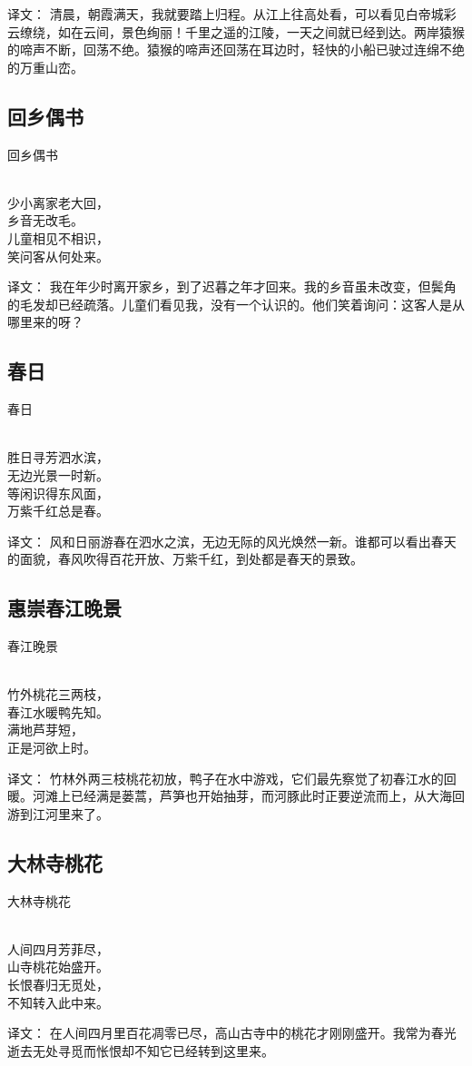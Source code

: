 译文：
清晨，朝霞满天，我就要踏上归程。从江上往高处看，可以看见白帝城彩云缭绕，如在云间，景色绚丽！千里之遥的江陵，一天之间就已经到达。两岸猿猴的啼声不断，回荡不绝。猿猴的啼声还回荡在耳边时，轻快的小船已驶过连绵不绝的万重山峦。

\subsection{回乡偶书}

\noindent 回乡偶书

 \\

\noindent 少小离家老大回，\\乡音无改毛。\\
儿童相见不相识，\\笑问客从何处来。

译文：
我在年少时离开家乡，到了迟暮之年才回来。我的乡音虽未改变，但鬓角的毛发却已经疏落。儿童们看见我，没有一个认识的。他们笑着询问：这客人是从哪里来的呀？

\subsection{春日}

\noindent 春日

 \\

\noindent 胜日寻芳泗水滨，\\无边光景一时新。\\
等闲识得东风面，\\万紫千红总是春。

译文：
风和日丽游春在泗水之滨，无边无际的风光焕然一新。谁都可以看出春天的面貌，春风吹得百花开放、万紫千红，到处都是春天的景致。

\subsection{惠崇春江晚景}

\noindent {}春江晚景

 \\

\noindent 竹外桃花三两枝，\\春江水暖鸭先知。\\
满地芦芽短，\\正是河欲上时。

译文：
竹林外两三枝桃花初放，鸭子在水中游戏，它们最先察觉了初春江水的回暖。河滩上已经满是蒌蒿，芦笋也开始抽芽，而河豚此时正要逆流而上，从大海回游到江河里来了。

\subsection{大林寺桃花}

\noindent 大林寺桃花

\\

\noindent 人间四月芳菲尽，\\山寺桃花始盛开。\\
长恨春归无觅处，\\不知转入此中来。

译文：
在人间四月里百花凋零已尽，高山古寺中的桃花才刚刚盛开。我常为春光逝去无处寻觅而怅恨却不知它已经转到这里来。